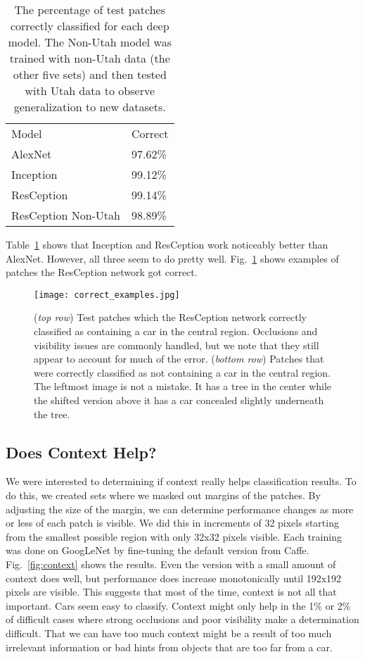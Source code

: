 \documentclass[runningheads]{llncs}
\begin{document}
\setlength{\tabcolsep}{4pt}
\begin{table}
\begin{center}
\caption{ The percentage of test patches correctly classified for each deep model. The Non-Utah model was trained with non-Utah data (the other five sets) and then tested with Utah data to observe generalization to new datasets. }
\label{table:class_correct}
\begin{tabular}{ll}
\hline\noalign{\smallskip}
Model & Correct\\
\noalign{\smallskip}
\hline
\noalign{\smallskip}
AlexNet & 97.62\%\\
Inception & 99.12\%\\
ResCeption & 99.14\%\\
ResCeption Non-Utah & 98.89\%\\
\hline
\end{tabular}
\end{center}
\end{table}
\setlength{\tabcolsep}{1.4pt}
Table~\ref{table:class_correct} shows that Inception and ResCeption work noticeably better than AlexNet. However, all three seem to do pretty well.  Fig.~\ref{fig:correct_examples} shows examples of patches the ResCeption network got correct. 

\begin{figure}
\centering
\texttt{[image: correct\_examples.jpg]}
\caption{ ({\it top row}) Test patches which the ResCeption network correctly classified as containing a car in the central region. Occlusions and visibility issues are commonly handled, but we note that they still appear to account for much of the error. 
({\it bottom row})  Patches that were correctly classified as not containing a car in the central region. The leftmost image is not a mistake. It has a tree in the center while the shifted version above it has a car concealed slightly underneath the tree. }
\label{fig:correct_examples}
\end{figure}

\subsection{Does Context Help?}
We were interested to determining if context really helps classification results. To do this, we created sets where we masked out margins of the patches. By adjusting the size of the margin, we can determine performance changes as more or less of each patch is visible. We did this in increments of 32 pixels starting from the smallest possible region with only 32x32 pixels visible. Each training was done on GoogLeNet by fine-tuning the default version from Caffe. Fig.~\ref{fig:context} shows the results. Even the version with a small amount of context does well, but performance does increase monotonically until 192x192 pixels are visible. This suggests that most of the time, context is not all that important. Cars seem easy to classify. Context might only help in the 1\% or 2\% of difficult cases where strong occlusions and poor visibility make a determination difficult. That we can have too much context might be a result of too much irrelevant information or bad hints from objects that are too far from a car. 
\end{document}
